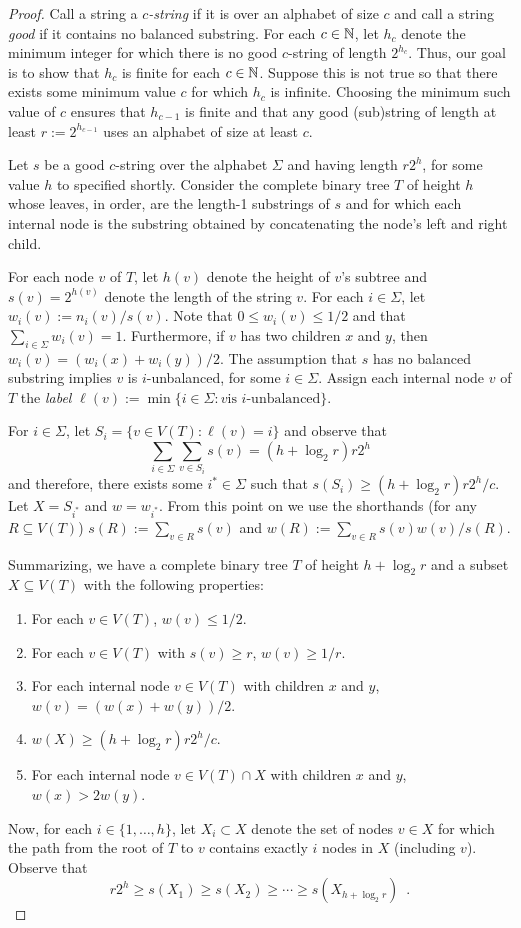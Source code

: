 \documentclass{patmorin}
\begin{document}
\begin{proof}
  Call a string a \emph{$c$-string} if it is over an alphabet of size $c$
  and call a string \emph{good} if it contains no balanced substring.
  For each $c\in\mathbb{N}$, let $h_c$ denote the minimum integer for which
  there is no good $c$-string of length $2^{h_c}$.  Thus, our goal is
  to show that $h_c$ is finite for each $c\in\mathbb{N}$.
  Suppose this is not true so that there exists some minimum value
  $c$ for which $h_c$ is infinite.  Choosing the minimum such value of 
  $c$ ensures that $h_{c-1}$ is finite and that any good (sub)string of
  length at least $r:=2^{h_{c-1}}$ uses an alphabet of size at least $c$.

  Let $s$ be a good $c$-string over the alphabet $\Sigma$ and having length $r2^{h}$, for some value $h$
  to specified shortly.   Consider the complete binary tree $T$ of
  height $h$ whose leaves, in order, are the length-1 substrings of
  $s$ and for which each internal node is the substring obtained by
  concatenating the node's left and right child.

  For each node $v$ of $T$, let $h(v)$ denote the height of $v$'s subtree
  and $s(v)=2^{h(v)}$ denote the length of the string $v$. For each
  $i\in\Sigma$, let $w_i(v):=n_i(v)/s(v)$.  Note that $0\le w_i(v)\le
  1/2$ and that $\sum_{i\in\Sigma} w_i(v)=1$.  Furthermore, if $v$
  has two children $x$ and $y$, then $w_i(v) = (w_i(x)+w_i(y))/2$.
  The assumption that $s$ has no balanced substring implies $v$ is
  $i$-unbalanced, for some $i\in\Sigma$.  Assign each internal node
  $v$ of $T$ the \emph{label} $\ell(v):=\min\{i\in\Sigma: \mbox{$v$
  is $i$-unbalanced}\}$.

  For $i\in\Sigma$, let $S_i=\{v\in V(T): \ell(v)=i\}$ and observe that 
  \[
      \sum_{i\in\Sigma} \sum_{v\in S_i} s(v) = (h+\log_2 r)r2^{h}
  \]
  and therefore, there exists some $i^*\in\Sigma$ such that
  $s(S_i)\ge (h+\log_2 r)r2^h/c$.  Let $X=S_{i^*}$ and $w=w_{i^*}$. From
  this point on we use the shorthands (for any $R\subseteq V(T)$) 
  $s(R):=\sum_{v\in R}s(v)$ and $w(R):=\sum_{v\in R}s(v)w(v)/s(R)$.

  Summarizing, we have a complete binary tree $T$ of height $h+\log_2 r$ and
  a subset $X\subseteq V(T)$ with the following properties: 
  \begin{enumerate}
    \item For each $v\in V(T)$, $w(v) \le 1/2$.
    \item For each $v\in V(T)$ with $s(v) \ge r$, $w(v)\ge 1/r$.
    \item For each internal node $v\in V(T)$ with children $x$ and $y$,
       $w(v) = (w(x)+w(y))/2$.
    \item $w(X) \ge (h+\log_2 r)r2^{h}/c$.
     \item For each internal node $v\in V(T)\cap X$ with children $x$ and $y$,
       $w(x) > 2w(y)$.
  \end{enumerate}
  Now, for each $i\in\{1,\ldots,h\}$, let $X_i\subset X$ denote the
  set of nodes $v\in X$ for which the path from the root of $T$ to $v$
  contains exactly $i$ nodes in $X$ (including $v$).  Observe that 
  \[  r2^h \ge s(X_1) \ge s(X_2) \ge \cdots\ge s(X_{h+\log_2 r}) \enspace . \]


\end{proof}
\end{document}
